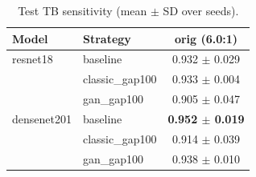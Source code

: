 \begin{table}[htbp]
\centering
\caption{Test TB sensitivity (mean $\pm$ SD over seeds).}
\label{tab:tb_recall}
\begin{tabular}{llc}
\toprule
Model & Strategy & orig (6.0:1) \\
\midrule
resnet18 & baseline & 0.932 $\pm$ 0.029 \\
 & classic\_gap100 & 0.933 $\pm$ 0.004 \\
 & gan\_gap100 & 0.905 $\pm$ 0.047 \\
\addlinespace
densenet201 & baseline & \textbf{0.952 $\pm$ 0.019} \\
 & classic\_gap100 & 0.914 $\pm$ 0.039 \\
 & gan\_gap100 & 0.938 $\pm$ 0.010 \\
\bottomrule
\end{tabular}
\end{table}